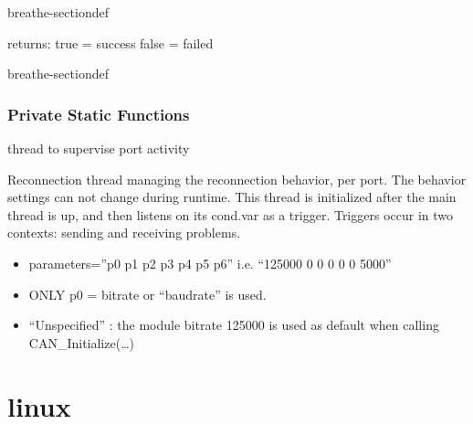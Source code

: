 \documentclass[a4paper,10pt,english]{sphinxmanual}
\begin{document}
\begin{fulllineitems}
\begin{sphinxuseclass}{breathe-sectiondef}
\begin{fulllineitems}
\sphinxAtStartPar
returns: true = success false = failed 

\end{fulllineitems}


\end{sphinxuseclass}
\begin{sphinxuseclass}{breathe-sectiondef}\subsubsection*{Private Static Functions}


\begin{fulllineitems}
\sphinxAtStartPar
thread to supervise port activity 

\end{fulllineitems}



\begin{fulllineitems}
\sphinxAtStartPar
Reconnection thread managing the reconnection behavior, per port. The behavior settings can not change during runtime. This thread is initialized after the main thread is up, and then listens on its cond.var as a trigger. Triggers occur in two contexts: sending and receiving problems.

\sphinxAtStartPar
{} 

\end{fulllineitems}


\end{sphinxuseclass}
\end{fulllineitems}

\begin{itemize}
\item {} 
\sphinxAtStartPar
parameters=”p0 p1 p2 p3 p4 p5 p6” i.e. “125000 0 0 0 0 0 5000”

\item {} 
\sphinxAtStartPar
ONLY p0 = bitrate or “baudrate” is used.

\item {} 
\sphinxAtStartPar
“Unspecified” : the module bitrate 125000 is used as default when calling CAN\_Initialize(…)

\end{itemize}


\section{linux}
\label{\detokenize{vendors/peak:linux}}
\end{document}
